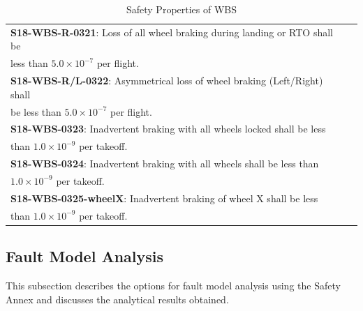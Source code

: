\begin{table}[t]
\begin{tabular}{@{}ll}
\textbf{S18-WBS-R-0321}: Loss of all wheel braking during landing or RTO shall be \\less than $5.0 \times 10^{-7}$ per flight.                                    \\ %
\textbf{S18-WBS-R/L-0322}: Asymmetrical loss of wheel braking (Left/Right) shall \\be less than $5.0 \times 10^{-7}$ per flight. \\ %
\textbf{S18-WBS-0323}: Inadvertent braking with all wheels locked shall be less \\than $1.0 \times 10^{-9}$ per takeoff.                                                                                                                                                                                                               \\ %
\textbf{S18-WBS-0324}: Inadvertent braking with all wheels shall be less than\\ $1.0 \times 10^{-9}$ per takeoff.                                                                                                            \\ %
\textbf{S18-WBS-0325-wheelX}: Inadvertent braking of wheel X shall be less \\than $1.0 \times 10^{-9}$ per takeoff.                                                                                                                                                                                                                            %
\end{tabular}
\caption{Safety Properties of WBS}
\vspace{-0.3in} 
\label{tab:safetyProperties}
\end{table}  

\subsection{Fault Model Analysis}
This subsection describes the %
 options for fault model analysis using the Safety Annex and discusses the analytical results obtained. 

